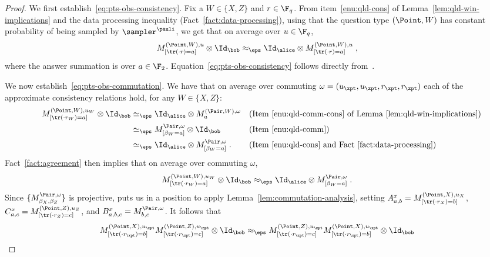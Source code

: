 \begin{proof}
We first establish~\eqref{eq:pts-obs-consistency}. Fix a $W \in \{X,Z\}$ and $r \in \F_q$. From item~\ref{enu:qld-cons} of Lemma~\ref{lem:qld-win-implications} and the data processing inequality (Fact~\ref{fact:data-processing}), using that the question type $(\Point,W)$ has constant probability of being sampled by $\sampler^\pauli$, we get that on average over $u \in \F_q$,
\[
	M^{(\Point,W),u}_{[\tr(\cdot r) = a]} \otimes \Id_\bob \approx_\eps \Id_\alice \otimes M^{(\Point,W),u}_{[\tr(\cdot r) = a]}\;,
\]
where the answer summation is over $a \in \F_2$. Equation~\eqref{eq:pts-obs-consistency} follows directly from~. 

We now establish~\eqref{eq:pts-obs-commutation}. We have that on average over {commuting} $\omega = (u_\xpt,u_\zpt,r_\xpt,r_\zpt)$ each of the approximate consistency relations hold, for any $W\in\{X,Z\}$:
\begin{align*}
	&& M^{(\Point,W),u_W}_{[\tr(\cdot r_W)=a]} \otimes \Id_\bob &\simeq_\eps \Id_\alice \otimes M^{(\Pair,W),\omega}_a && \text{(Item~\ref{enu:qld-comm-cons} of Lemma~\ref{lem:qld-win-implications})}\\
	&& &\simeq_\eps M^{\Pair,\omega}_{[\beta_W = a]} \otimes \Id_\bob && \text{(Item~\ref{enu:qld-comm})} \\
	&& &\simeq_\eps \Id_\alice \otimes M^{\Pair,\omega}_{[\beta_W = a]}\;. && \text{(Item~\ref{enu:qld-cons} and Fact~\ref{fact:data-processing})}
\end{align*}
Fact~\ref{fact:agreement} then implies that on average over commuting $\omega$, 
\begin{equation}\label{eq:lc-11}
	M^{(\Point,W),u_W}_{[\tr(\cdot r_W)=a]} \otimes \Id_\bob \approx_\eps \Id_\alice \otimes M^{\Pair,\omega}_{[\beta_W = a]}\;.
\end{equation}
Since
$\{M^{\Pair,\omega}_{\beta_X,\beta_Z} \}$ is projective,
 puts us in
a position to apply Lemma~\ref{lem:commutation-analysis}, setting
$A^{x}_{a,b} = M^{(\Point, X), u_X}_{[\tr(\cdot r_X) = b]}$,
$C^{x}_{a,c} = M^{(\Point, Z), u_Z}_{[\tr(\cdot r_Z) = c]}$, and
$B^{x}_{a,b,c} = M^{\Pair, \omega}_{b,c}$. It follows that
\begin{equation}
\label{eq:qld-obs-comm}
	 M^{(\Point,X),u_\xpt}_{[\tr(\cdot r_\xpt)=b]} M^{(\Point,Z),u_\zpt}_{[\tr(\cdot r_\zpt)=c]} \otimes \Id_\bob \approx_\eps  M^{(\Point,Z),u_\zpt}_{[\tr(\cdot r_\zpt)=c]} M^{(\Point,X),u_\xpt}_{[\tr(\cdot r_\xpt)=b]}  \otimes \Id_\bob
\end{equation}

\end{proof}
